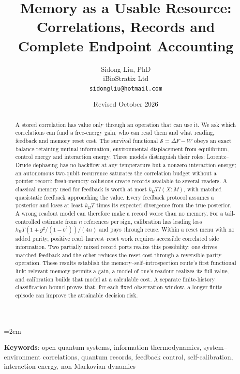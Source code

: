 \documentclass[12pt]{article}
\title{Memory as a Usable Resource:\\
Correlations, Records and Complete Endpoint Accounting}
\author{Sidong Liu, PhD \\
\small iBioStratix Ltd \\
\small \texttt{sidongliu@hotmail.com}}
\date{Revised October 2026}
\begin{document}
\emergencystretch=2em
\raggedbottom
{}
\maketitle

\begin{abstract}
A stored correlation has value only through an operation that can use it.
We ask which correlations can fund a free-energy gain, who can read them
and what reading, feedback and memory reset cost. The survival functional
$\mathcal S=\Delta F-W$ obeys an exact balance retaining mutual information,
environmental displacement from equilibrium, control energy and
interaction energy. Three models distinguish their roles: Lorentz--Drude
dephasing has no backflow at any temperature but a nonzero interaction
energy; an autonomous two-qubit recurrence saturates the correlation
budget without a pointer record; fresh-memory collisions create records
available to several readers. A classical memory used for feedback is
worth at most $k_BT I(X{:}M)$, with matched quasistatic feedback approaching the
value. Every feedback protocol assumes a posterior and loses at least
$k_BT$ times its expected divergence from the true posterior. A wrong
readout model can therefore make a record worse than no memory. For a
tail-controlled estimate from $n$ references per sign, calibration has
leading loss $k_BT(1+g^2/(1-b^2))/(4n)$ and pays through reuse. Within a reset menu with no added purity, positive read--harvest--reset
work requires accessible correlated side information. Two partially mixed
record ports realize this possibility: one drives matched feedback and the
other reduces the reset cost through a reversible parity operation. These results establish
the memory--self--introspection route's first functional link: relevant
memory permits a gain, a model of one's readout realizes its full value,
and calibration builds that model at a calculable cost. A separate finite-history
classification bound proves that, for each fixed observation window, a
longer finite episode can improve the attainable decision risk.
\end{abstract}

\medskip
\noindent\textbf{Keywords}: open quantum systems, information thermodynamics, system--environment correlations, quantum records, feedback control, self-calibration, interaction energy, non-Markovian dynamics

\end{document}
